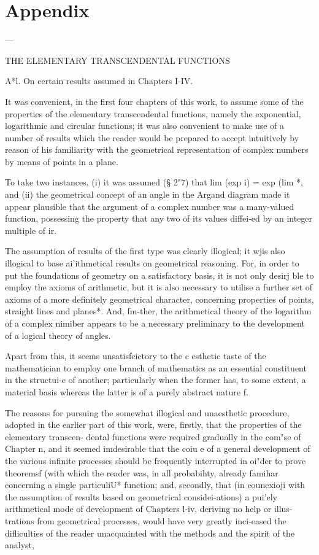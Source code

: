 \chapter{Appendix}
—

THE ELEMENTARY TRANSCENDENTAL FUNCTIONS

A*l. On certain results assumed in Chapters I-IV.

It was convenient, in the first four chapters of this work, to assume
some of the properties of the elementary transcendental functions,
namely the exponential, logarithmic and circular functions; it was
also convenient to make use of a number of results which the reader
would be prepared to accept intuitively by reason of his familiarity
with the geometrical representation of complex numbers by means of
points in a plane.

To take two instances, (i) it was assumed (§ 2"7) that lim (exp i) =
exp (lim *, and (ii) the geometrical concept of an angle in the
Argand diagram made it appear plausible that the argument of a complex
number was a many-valued function, possessing the property that any
two of its values diffei-ed by an integer multiple of ir.

The assumption of results of the first type was clearly illogical; it
wjis also illogical to base ai'ithmetical results on geometrical
reasoning. For, in order to put the foundations of geometry on a
satisfactory basis, it is not only desirj ble to employ the axioms of
arithmetic, but it is also necessary to utilise a further set of
axioms of a more definitely geometrical character, concerning
properties of points, straight lines and planes*. And, fm-ther, the
arithmetical theory of the logarithm of a complex nimiber appears to
be a necessary preliminary to the development of a logical theory of
angles.

Apart from this, it seems unsatisfcictory to the c esthetic taste of
the mathematician to employ one branch of mathematics as an essential
constituent in the structui-e of another; particularly when the
former has, to some extent, a material basis whereas the latter is of
a purely abstract nature f.

The reasons for pursuing the somewhat illogical and unaesthetic
procedure, adopted in the earlier part of this work, were, firstly,
that the properties of the elementary transcen- dental functions were
required gradually in the com"se of Chapter n, and it seemed
imdesirable that the coiu e of a general development of the various
infinite processes should be frequently interrupted in oi"der to prove
theoremsf (with which the reader was, in all probabihty, already
famihar concerning a single particuliU* function; and, secondly, that
(in counexioji with the assumption of results based on geometrical
considei-ations) a pui'ely arithmetical mode of development of
Chapters l-iv, deriving no help or illus- trations from geometrical
processes, would have very greatly inci-eased the difliculties of the
reader unacquainted with the methods and the spirit of the analyst,

